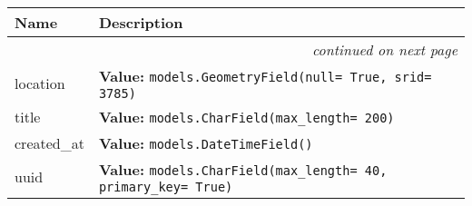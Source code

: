     \vspace{-1cm}
\hspace{\varindent}\begin{longtable}{|p{\varnamewidth}|p{\vardescrwidth}|l}
\cline{1-2}
\cline{1-2} \centering \textbf{Name} & \centering \textbf{Description}& \\
\cline{1-2}
\endhead\cline{1-2}\multicolumn{3}{r}{\small\textit{continued on next page}}\\\endfoot\cline{1-2}
\endlastfoot\raggedright l\-o\-c\-a\-t\-i\-o\-n\- & \raggedright \textbf{Value:} 
{\tt models.GeometryField(null= True, srid= 3785)}&\\
\cline{1-2}
\raggedright t\-i\-t\-l\-e\- & \raggedright \textbf{Value:} 
{\tt models.CharField(max\_length= 200)}&\\
\cline{1-2}
\raggedright c\-r\-e\-a\-t\-e\-d\-\_\-a\-t\- & \raggedright \textbf{Value:} 
{\tt models.DateTimeField()}&\\
\cline{1-2}
\raggedright u\-u\-i\-d\- & \raggedright \textbf{Value:} 
{\tt models.CharField(max\_length= 40, primary\_key= True)}&\\
\cline{1-2}
\end{longtable}

